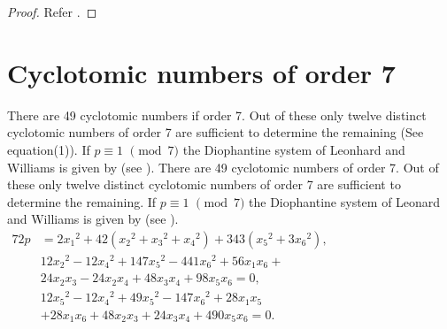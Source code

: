 \documentclass[a4paper,12pt]{article}
\def\vpmod{\!\!\!\pmod}
\begin{document}
\begin{proof}
Refer \cite{15}.
\end{proof}
\section{Cyclotomic numbers of order 7}
There are 49 cyclotomic numbers if order 7. Out of these only twelve distinct cyclotomic numbers of order 7 are sufficient to determine the remaining (See equation(1)). 
If $p\equiv 1\,\,\vpmod7$ the Diophantine system of Leonhard and Williams is given by (see \cite{10}).
There are 49 cyclotomic numbers of order 7. Out of these only twelve distinct cyclotomic numbers of order 7 are sufficient to determine the remaining.
If $p\equiv 1\,\,\vpmod7$ the Diophantine system of Leonard and Williams is given by (see \cite{10}).\\

	$\begin{aligned}
		72p&=2{x_{1}}^2+42({x_{2}}^2+{x_{3}}^2+{x_{4}}^2)+343({x_{5}}^2+3{x_{6}}^2),\\
		&12{x_{2}}^2-12{x_{4}}^2+147{x_{5}}^2-441{x_{6}}^2+56x_{1}x_{6}+\\
		&24x_{2}x_{3}-24x_{2}x_{4}+48x_{3}x_{4}+98x_{5}x_{6}=0,\\
		&12{x_{5}}^2-12{x_{4}}^2+49{x_{5}}^2-147{x_{6}}^2+28x_{1}x_{5}\\
		&+28x_{1}x_{6}+48x_{2}x_{3}+24x_{3}x_{4}+490x_{5}x_{6}=0.
	\end{aligned}$\\
\end{document}
